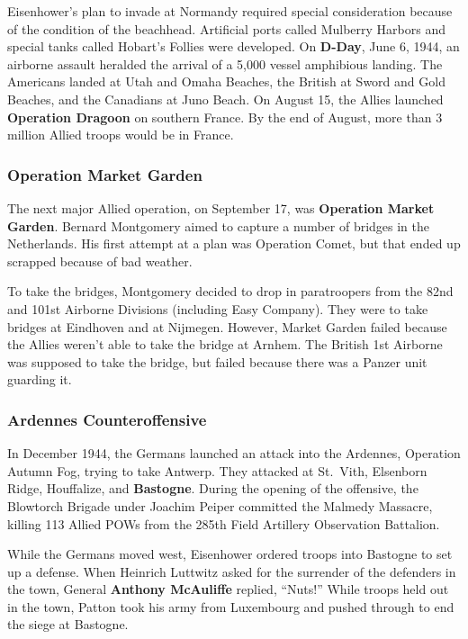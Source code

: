 Eisenhower's plan to invade at Normandy required special consideration because of the condition of the beachhead.
Artificial ports called Mulberry Harbors and special tanks called Hobart's Follies were developed.
On \textbf{D-Day}, June 6, 1944, an airborne assault heralded the arrival of a 5,000 vessel amphibious landing.
The Americans landed at Utah and Omaha Beaches,
the British at Sword and Gold Beaches,
and the Canadians at Juno Beach.
On August 15, the Allies launched \textbf{Operation Dragoon} on southern France.
By the end of August, more than 3 million Allied troops would be in France.

\subsubsection*{Operation Market Garden}

The next major Allied operation, on September 17, was \textbf{Operation Market Garden}.
Bernard Montgomery aimed to capture a number of bridges in the Netherlands.
His first attempt at a plan was Operation Comet, but that ended up scrapped because of bad weather.

To take the bridges, Montgomery decided to drop in paratroopers from the 82nd and 101st Airborne Divisions
(including Easy Company).
They were to take bridges at Eindhoven and at Nijmegen.
However, Market Garden failed because the Allies weren't able to take the bridge at Arnhem.
The British 1st Airborne was supposed to take the bridge, but failed because there was a Panzer unit guarding it.

\subsubsection*{Ardennes Counteroffensive}

In December 1944, the Germans launched an attack into the Ardennes, Operation Autumn Fog,
trying to take Antwerp.
They attacked at St.\ Vith, Elsenborn Ridge, Houffalize, and \textbf{Bastogne}.
During the opening of the offensive,
the Blowtorch Brigade under Joachim Peiper committed the Malmedy Massacre,
killing 113 Allied POWs from the 285th Field Artillery Observation Battalion.

While the Germans moved west, Eisenhower ordered troops into Bastogne to set up a defense.
When Heinrich Luttwitz asked for the surrender of the defenders in the town,
General \textbf{Anthony McAuliffe} replied, ``Nuts!''
While troops held out in the town,
Patton took his army from Luxembourg and pushed through to end the siege at Bastogne.

